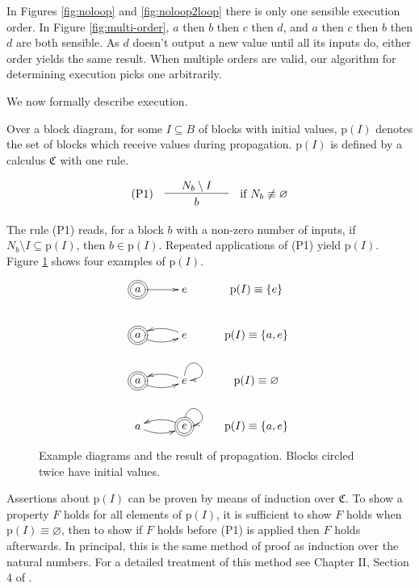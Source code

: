 \documentclass[twocolumn]{article}
\newcommand*{\Inputs}[1]{N_{#1}}
\begin{document}
In Figures \ref{fig:noloop} and \ref{fig:noloop2loop} there is only one sensible execution order. In Figure \ref{fig:multi-order}, $a$ then $b$ then $c$ then $d$, and $a$ then $c$ then $b$ then $d$ are both sensible. As $d$ doesn't output a new value until all its inputs do, either order yields the same result. When multiple orders are valid, our algorithm for determining execution picks one arbitrarily.

We now formally describe execution.

Over a block diagram, for some $I\subseteq B$ of blocks with initial values, $\text{p}(I)$ denotes the set of blocks which receive values during propagation. $\text{p}(I)$ is defined by a calculus $\mathfrak{C}$ with one rule.

\[
    \text{(P1)}\quad\begin{array}{l c l}
    & \Inputs{b} \setminus I & \\
    \hline\\[-1em]
    & b &
    \end{array} \quad\text{if } \Inputs{b}\not\equiv\varnothing
\]

The rule (P1) reads, for a block $b$ with a non-zero number of inputs, if $\Inputs{b}\setminus I \subseteq \text{p}(I)$, then $b\in \text{p}(I)$. Repeated applications of (P1) yield $\text{p}(I)$. Figure \ref{fig:pexamples} shows four examples of $\text{p}(I)$.

\begin{figure}[h]
\[
    \xymatrix{
    *++[o][F=]{a} \ar[r] & e & \text{p}(I)\equiv \{e\} \\
    *++[o][F=]{a} \ar@/_/[r] & e \ar@/_/[l] & \text{p}(I)\equiv \{a, e\} \\
    *++[o][F=]{a} \ar@/_/[r] & e \ar@(u, r)[] \ar@/_/[l] & \text{p}(I)\equiv \varnothing \\
    a \ar@/_/[r] & *++[o][F=]{e} \ar@(u, r)[] \ar@/_/[l] & \text{p}(I)\equiv \{a, e\} \\
    }
\]
    \caption{Example diagrams and the result of propagation. Blocks circled twice have initial values.}
    \label{fig:pexamples}
\end{figure}

Assertions about $\text{p}(I)$ can be proven by means of induction over $\mathfrak{C}$. To show a property $F$ holds for all elements of $\text{p}(I)$, it is sufficient to show $F$ holds when $\text{p}(I)\equiv \varnothing$, then to show if $F$ holds before (P1) is applied then $F$ holds afterwards. In principal, this is the same method of proof as induction over the natural numbers. For a detailed treatment of this method see Chapter II, Section 4 of \cite{Ebbinghaus-Flum-Thomas}.
\end{document}

